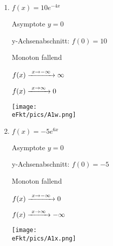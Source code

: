 \begin{Answer}[ref=eFktA1]
\begin{minipage}{\textwidth}
{\begin{minipage}{0.5\textwidth}
\begin{enumerate}[label=\alph*)]
				Monoton wachsend

				\(f(x)\xrightarrow{\hphantom{\ }x\to-\infty\hphantom{\ }}-\infty\)

				\(f(x)\xrightarrow{\hphantom{\ }x\to\infty\hphantom{\ }}0\)

				\texttt{[image: \\eFkt/pics/A1v.png]}
				\item \(f(x)=10e^{-4x}\)

				Asymptote \(y=0\)

				y-Achsenabschnitt: \(f(0)=10\)

				Monoton fallend

				\(f(x)\xrightarrow{\hphantom{\ }x\to-\infty\hphantom{\ }}\infty\)

				\(f(x)\xrightarrow{\hphantom{\ }x\to\infty\hphantom{\ }}0\)

				\texttt{[image: \\eFkt/pics/A1w.png]}
				\item \(f(x)=-5e^{6x}\)

				Asymptote \(y=0\)

				y-Achsenabschnitt: \(f(0)=-5\)

				Monoton fallend

				\(f(x)\xrightarrow{\hphantom{\ }x\to-\infty\hphantom{\ }}0\)

				\(f(x)\xrightarrow{\hphantom{\ }x\to\infty\hphantom{\ }}-\infty\)

				\texttt{[image: \\eFkt/pics/A1x.png]}
			\end{enumerate}
		\end{minipage}}%
	\end{minipage}%

	\begin{minipage}{\textwidth}
\end{minipage}
\end{Answer}
